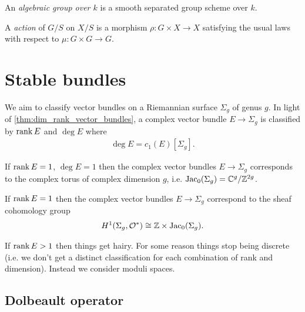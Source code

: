 \documentclass{article}
\begin{document}
\begin{definition}
  An \emph{algebraic group over $k$} is a smooth separated
  group scheme over $k$.
\end{definition}

\begin{definition}
  A \emph{action} of $G/S$ on $X/S$ is a morphism
  $\rho : G\times X\to X$ satisfying the usual laws with respect
  to $\mu:G\times G\to G$.
\end{definition}

\section{Stable bundles}

We aim to classify vector bundles on a Riemannian surface $\Sigma_g$
of genus $g$. In light of \ref{thm:dim_rank_vector_bundles},
a complex vector bundle $E\to\Sigma_g$ is classified by
$\operatorname{rank} E$ and $\deg E$ where 
\begin{align*}
  \deg E = c_1(E)[\Sigma_g].
\end{align*}

If $\operatorname{rank} E = 1$, $\deg E = 1$ then the complex vector bundles
$E\to\Sigma_g$ corresponds to the complex torus of complex dimension
$g$, i.e. $\operatorname{Jac}_0(\Sigma_g)=\mathbb{C}^g / \mathbb{Z}^{2g}$.

If $\operatorname{rank} E = 1$ then the complex vector bundles $E\to\Sigma_g$
correspond to the sheaf cohomology  group
\begin{align*}
  H^1(\Sigma_g,\mathcal O^*) \cong \mathbb{Z}\times\operatorname{Jac}_0(\Sigma_g).
\end{align*}

If $\operatorname{rank} E>1$ then things get hairy. For some reason 
things stop being discrete (i.e. we don't get a distinct classification
for each combination of rank and dimension). Instead we consider
moduli spaces.

\subsection{Dolbeault operator}
\end{document}
